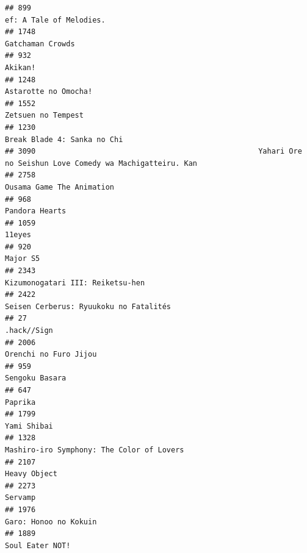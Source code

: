 \documentclass[
]{article}
\begin{document}
\begin{verbatim}
## 899                                                                                    ef: A Tale of Melodies.
## 1748                                                                                          Gatchaman Crowds
## 932                                                                                                    Akikan!
## 1248                                                                                      Astarotte no Omocha!
## 1552                                                                                        Zetsuen no Tempest
## 1230                                                                               Break Blade 4: Sanka no Chi
## 3090                                                   Yahari Ore no Seishun Love Comedy wa Machigatteiru. Kan
## 2758                                                                                 Ousama Game The Animation
## 968                                                                                             Pandora Hearts
## 1059                                                                                                    11eyes
## 920                                                                                                   Major S5
## 2343                                                                          Kizumonogatari III: Reiketsu-hen
## 2422                                                                    Seisen Cerberus: Ryuukoku no Fatalités
## 27                                                                                                 .hack//Sign
## 2006                                                                                     Orenchi no Furo Jijou
## 959                                                                                             Sengoku Basara
## 647                                                                                                    Paprika
## 1799                                                                                               Yami Shibai
## 1328                                                                 Mashiro-iro Symphony: The Color of Lovers
## 2107                                                                                              Heavy Object
## 2273                                                                                                   Servamp
## 1976                                                                                     Garo: Honoo no Kokuin
## 1889                                                                                           Soul Eater NOT!

\end{verbatim}
\end{document}
